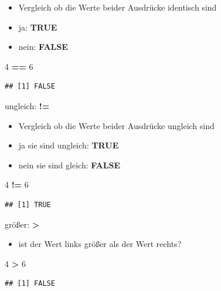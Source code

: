 \documentclass[]{book}
\newenvironment{Shaded}{\begin{snugshade}}{\end{snugshade}}
\newcommand{\DecValTok}[1]{\textcolor[rgb]{0.00,0.00,0.81}{#1}}
\newcommand{\StringTok}[1]{\textcolor[rgb]{0.31,0.60,0.02}{#1}}
\newcommand{\OperatorTok}[1]{\textcolor[rgb]{0.81,0.36,0.00}{\textbf{#1}}}
\providecommand{\tightlist}{%
  \setlength{\itemsep}{0pt}\setlength{\parskip}{0pt}}
\begin{document}
\begin{itemize}
\tightlist
\item
  Vergleich ob die Werte beider Ausdrücke identisch sind
\item
  ja: \textbf{TRUE}
\item
  nein: \textbf{FALSE}
\end{itemize}

\begin{Shaded}
\begin{Highlighting}[]
\DecValTok{4} \OperatorTok{==}\StringTok{ }\DecValTok{6}
\end{Highlighting}
\end{Shaded}

\begin{verbatim}
## [1] FALSE
\end{verbatim}

ungleich: \textbf{!=}

\begin{itemize}
\tightlist
\item
  Vergleich ob die Werte beider Ausdrücke ungleich sind
\item
  ja sie sind ungleich: \textbf{TRUE}
\item
  nein sie sind gleich: \textbf{FALSE}
\end{itemize}

\begin{Shaded}
\begin{Highlighting}[]
\DecValTok{4} \OperatorTok{!=}\StringTok{ }\DecValTok{6}
\end{Highlighting}
\end{Shaded}

\begin{verbatim}
## [1] TRUE
\end{verbatim}

größer: \textbf{\textgreater{}}

\begin{itemize}
\tightlist
\item
  ist der Wert links größer als der Wert rechts?
\end{itemize}

\begin{Shaded}
\begin{Highlighting}[]
\DecValTok{4} \OperatorTok{>}\StringTok{ }\DecValTok{6}
\end{Highlighting}
\end{Shaded}

\begin{verbatim}
## [1] FALSE
\end{verbatim}
\end{document}
